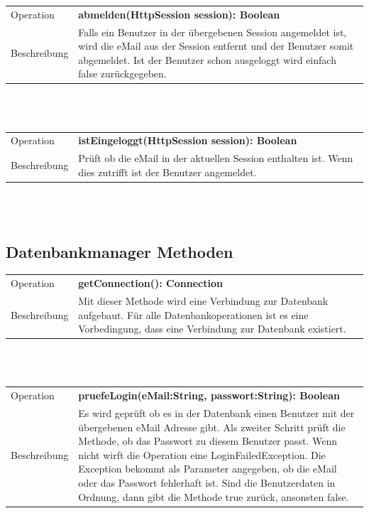 \documentclass[12pt]{scrreprt}
\begin{document}
\begin{tabular}{|lp{12cm}|}
	\hline
	Operation &  \textbf{abmelden(HttpSession session): Boolean }\\ 
	Beschreibung & Falls ein Benutzer in der übergebenen Session angemeldet ist, wird die eMail aus der Session entfernt und der Benutzer somit abgemeldet. Ist der Benutzer schon ausgeloggt wird einfach false zurückgegeben.\\ 
	\hline 
\end{tabular} \\\\

\begin{tabular}{|lp{12cm}|}
	\hline
	Operation &  \textbf{istEingeloggt(HttpSession session): Boolean }\\ 
	Beschreibung & Prüft ob die eMail in der aktuellen Session enthalten ist. Wenn dies zutrifft ist der Benutzer angemeldet.\\ 
	\hline 
\end{tabular} \\\\




\subsection{Datenbankmanager  Methoden}
\begin{tabular}{|lp{12cm}|}
	\hline
	Operation &  \textbf{getConnection(): Connection}\\ 
	Beschreibung & Mit dieser Methode wird eine Verbindung zur Datenbank aufgebaut. Für alle Datenbankoperationen ist es eine Vorbedingung, dass eine Verbindung zur Datenbank existiert. \\ 
	\hline 
\end{tabular} \\\\

\begin{tabular}{|lp{12cm}|}
	\hline
	Operation &  \textbf{pruefeLogin(eMail:String, passwort:String): Boolean}\\ 
	Beschreibung & Es wird geprüft ob es in der Datenbank einen Benutzer mit der übergebenen eMail Adresse gibt. Als zweiter Schritt prüft die Methode, ob das Passwort zu diesem Benutzer passt. Wenn nicht wirft die Operation eine LoginFailedException. Die Exception bekommt als Parameter angegeben, ob die eMail oder das Passwort fehlerhaft ist. Sind die Benutzerdaten in Ordnung, dann gibt die Methode true zurück, ansonsten false.\\
	\hline 
\end{tabular} \\\\
\end{document}
